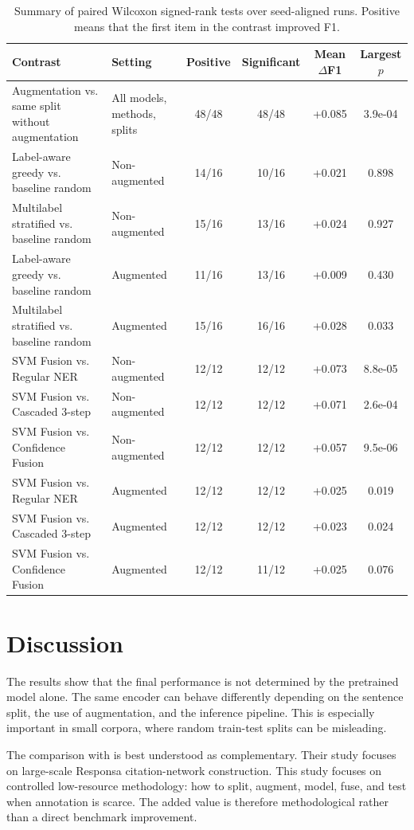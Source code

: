 \documentclass[11pt,a4paper]{article}
\begin{document}
\begin{table}[htbp]
\centering
\scriptsize
\caption{Summary of paired Wilcoxon signed-rank tests over seed-aligned runs. Positive means that the first item in the contrast improved F1.}
\label{tab:wilcoxon_summary}
\begin{tabular}{p{4.7cm}p{2.3cm}cccc}
\toprule
Contrast & Setting & Positive & Significant & Mean $\Delta$F1 & Largest $p$ \\
\midrule
Augmentation vs. same split without augmentation & All models, methods, splits & 48/48 & 48/48 & +0.085 & 3.9e-04 \\
Label-aware greedy vs. baseline random & Non-augmented & 14/16 & 10/16 & +0.021 & 0.898 \\
Multilabel stratified vs. baseline random & Non-augmented & 15/16 & 13/16 & +0.024 & 0.927 \\
Label-aware greedy vs. baseline random & Augmented & 11/16 & 13/16 & +0.009 & 0.430 \\
Multilabel stratified vs. baseline random & Augmented & 15/16 & 16/16 & +0.028 & 0.033 \\
SVM Fusion vs. Regular NER & Non-augmented & 12/12 & 12/12 & +0.073 & 8.8e-05 \\
SVM Fusion vs. Cascaded 3-step & Non-augmented & 12/12 & 12/12 & +0.071 & 2.6e-04 \\
SVM Fusion vs. Confidence Fusion & Non-augmented & 12/12 & 12/12 & +0.057 & 9.5e-06 \\
SVM Fusion vs. Regular NER & Augmented & 12/12 & 12/12 & +0.025 & 0.019 \\
SVM Fusion vs. Cascaded 3-step & Augmented & 12/12 & 12/12 & +0.023 & 0.024 \\
SVM Fusion vs. Confidence Fusion & Augmented & 12/12 & 11/12 & +0.025 & 0.076 \\
\bottomrule
\end{tabular}
\end{table}

\section{Discussion}
The results show that the final performance is not determined by the pretrained model alone. The same encoder can behave differently depending on the sentence split, the use of augmentation, and the inference pipeline. This is especially important in small corpora, where random train-test splits can be misleading.

The comparison with \citet{bengigi2025} is best understood as complementary. Their study focuses on large-scale Responsa citation-network construction. This study focuses on controlled low-resource methodology: how to split, augment, model, fuse, and test when annotation is scarce. The added value is therefore methodological rather than a direct benchmark improvement.
\end{document}
